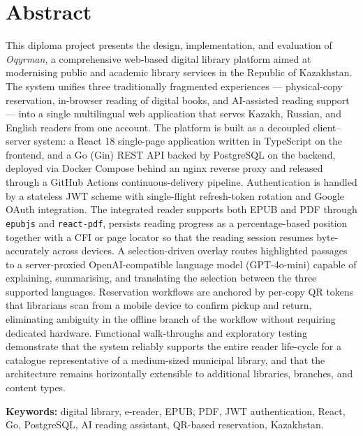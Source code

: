 \documentclass[12pt,a4paper]{report}
\begin{document}
\chapter*{Abstract}

This diploma project presents the design, implementation, and evaluation of
\textit{Oqyrman}, a comprehensive web-based digital library platform aimed at
modernising public and academic library services in the Republic of Kazakhstan.
The system unifies three traditionally fragmented experiences --- physical-copy
reservation, in-browser reading of digital books, and AI-assisted reading
support --- into a single multilingual web application that serves Kazakh,
Russian, and English readers from one account. The platform is built as a
decoupled client--server system: a React 18 single-page application written in
TypeScript on the frontend, and a Go (Gin) REST API backed by PostgreSQL on
the backend, deployed via Docker Compose behind an nginx reverse proxy and
released through a GitHub Actions continuous-delivery pipeline. Authentication
is handled by a stateless JWT scheme with single-flight refresh-token rotation
and Google OAuth integration. The integrated reader supports both EPUB and PDF
through \texttt{epubjs} and \texttt{react-pdf}, persists reading progress as a
percentage-based position together with a CFI or page locator so that the
reading session resumes byte-accurately across devices. A selection-driven
overlay routes highlighted passages to a server-proxied OpenAI-compatible
language model (GPT-4o-mini) capable of explaining, summarising, and
translating the selection between the three supported languages. Reservation
workflows are anchored by per-copy QR tokens that librarians scan from a
mobile device to confirm pickup and return, eliminating ambiguity in the
offline branch of the workflow without requiring dedicated hardware.
Functional walk-throughs and exploratory testing demonstrate that the system
reliably supports the entire reader life-cycle for a catalogue representative
of a medium-sized municipal library, and that the architecture remains
horizontally extensible to additional libraries, branches, and content types.

\textbf{Keywords:} digital library, e-reader, EPUB, PDF, JWT authentication,
React, Go, PostgreSQL, AI reading assistant, QR-based reservation, Kazakhstan.
\end{document}
